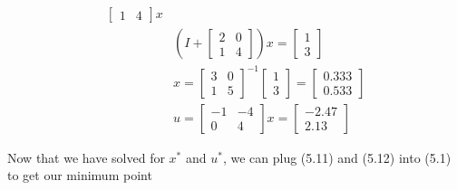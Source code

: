 \documentclass{article}
\begin{document}
\begin{align*}
\begin{bmatrix}
      1 & 4   
    \end{bmatrix} x  \\
    &(I + 
    \begin{bmatrix}
      2 & 0 \\
      1 & 4   
    \end{bmatrix})x = 
    \begin{bmatrix}
      1 \\
      3
    \end{bmatrix} \\
    &x = 
    \begin{bmatrix}
      3 & 0 \\
      1 & 5
    \end{bmatrix}^{-1}
    \begin{bmatrix}
      1 \\
      3   
    \end{bmatrix} = 
    \begin{bmatrix}
      0.333 \\
      0.533 
    \end{bmatrix} \tag{5.11} \\
    &u = 
    \begin{bmatrix}
       -1 & -4 \\
        0 &  4
    \end{bmatrix}x = 
    \begin{bmatrix}
      -2.47 \\
      2.13 
    \end{bmatrix} \tag{5.12} 
  \end{align*}
  
  \noindent Now that we have solved for $x^*$ and $u^*$, we can plug (5.11) and (5.12) into (5.1) to get our minimum point
\end{document}
